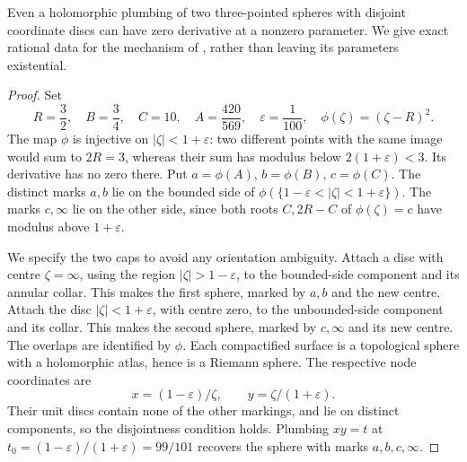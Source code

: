 \begin{example}
\label{A:hinich-explicit}
Even a holomorphic plumbing of two three-pointed spheres with
disjoint coordinate discs can have zero derivative at a nonzero
parameter. We give exact rational data for the mechanism of
\citet[\S\S2.1--2.3]{Hinich2010}, rather than leaving its
parameters existential.
\end{example}

\begin{proof}
Set
\[
 R=\frac32,\quad B=\frac34,\quad C=10,\quad
 A=\frac{420}{569},\quad\varepsilon=\frac1{100},\quad
 \phi(\zeta)=(\zeta-R)^2.
\]
The map $\phi$ is injective on $|\zeta|<1+\varepsilon$:
two different points with the same image would sum to $2R=3$,
whereas their sum has modulus below $2(1+\varepsilon)<3$.
Its derivative has no zero there. Put
$a=\phi(A)$, $b=\phi(B)$, $c=\phi(C)$. The distinct marks
$a,b$ lie on the bounded side of
$\phi(\{1-\varepsilon<|\zeta|<1+\varepsilon\})$.
The marks $c,\infty$ lie on the other side, since both roots
$C,2R-C$ of $\phi(\zeta)=c$ have modulus above $1+\varepsilon$.

We specify the two caps to avoid any orientation ambiguity.
Attach a disc with centre $\zeta=\infty$, using the region
$|\zeta|>1-\varepsilon$, to the bounded-side component and its
annular collar. This makes the first sphere, marked by $a,b$
and the new centre. Attach the disc $|\zeta|<1+\varepsilon$,
with centre zero, to the unbounded-side component and its collar.
This makes the second sphere, marked by $c,\infty$ and its
new centre. The overlaps are identified by $\phi$.
Each compactified surface is a topological sphere with a
holomorphic atlas, hence is a Riemann sphere. The respective
node coordinates are
\[
             x=(1-\varepsilon)/\zeta,\qquad
             y=\zeta/(1+\varepsilon).
\]
Their unit discs contain none of the other markings, and lie
on distinct components, so the disjointness condition holds.
Plumbing $xy=t$ at
$t_0=(1-\varepsilon)/(1+\varepsilon)=99/101$
recovers the sphere with marks $a,b,c,\infty$.


\end{proof}
